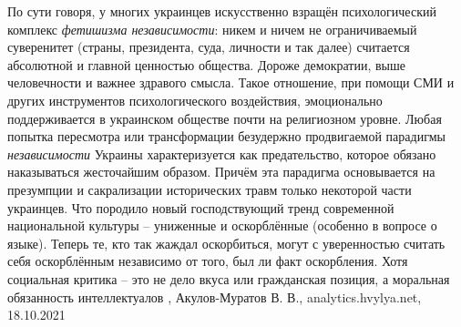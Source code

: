 По сути говоря, у многих украинцев искусственно взращён психологический
комплекс \emph{фетишизма независимости}: никем и ничем не ограничиваемый суверенитет
(страны, президента, суда, личности и так далее) считается абсолютной и главной
ценностью общества. Дороже демократии, выше человечности и важнее здравого
смысла. Такое отношение, при помощи СМИ и других инструментов психологического
воздействия, эмоционально поддерживается в украинском обществе почти на
религиозном уровне. Любая попытка пересмотра или трансформации безудержно
продвигаемой парадигмы \emph{независимости} Украины характеризуется как предательство,
которое обязано наказываться жесточайшим образом.
Причём эта парадигма основывается на презумпции и сакрализации исторических
травм только некоторой части украинцев. Что породило новый господствующий тренд
современной национальной культуры – униженные и оскорблённые (особенно в
вопросе о языке). Теперь те, кто так жаждал оскорбиться, могут с уверенностью
считать себя оскорблённым независимо от того, был ли факт оскорбления. Хотя
социальная критика – это не дело вкуса или гражданская позиция, а моральная
обязанность интеллектуалов
, 
Акулов-Муратов В. В., analytics.hvylya.net, 18.10.2021
